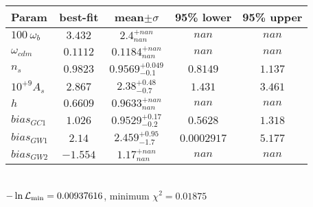 \begin{tabular}{|l|c|c|c|c|} 
 \hline 
Param & best-fit & mean$\pm\sigma$ & 95\% lower & 95\% upper \\ \hline 
$100~\omega_{b }$ &$3.432$ & $2.4_{nan}^{+nan}$ & $nan$ & $nan$ \\ 
$\omega_{cdm }$ &$0.1112$ & $0.1184_{nan}^{+nan}$ & $nan$ & $nan$ \\ 
$n_{s }$ &$0.9823$ & $0.9569_{-0.1}^{+0.049}$ & $0.8149$ & $1.137$ \\ 
$10^{+9}A_{s }$ &$2.867$ & $2.38_{-0.7}^{+0.48}$ & $1.431$ & $3.461$ \\ 
$h$ &$0.6609$ & $0.9633_{nan}^{+nan}$ & $nan$ & $nan$ \\ 
$bias_{GC 1 }$ &$1.026$ & $0.9529_{-0.2}^{+0.17}$ & $0.5628$ & $1.318$ \\ 
$bias_{GW 1 }$ &$2.14$ & $2.459_{-1.7}^{+0.95}$ & $0.0002917$ & $5.177$ \\ 
$bias_{GW 2 }$ &$-1.554$ & $1.17_{nan}^{+nan}$ & $nan$ & $nan$ \\ 
\hline 
 \end{tabular} \\ 
$-\ln{\cal L}_\mathrm{min} =0.00937616$, minimum $\chi^2=0.01875$ \\ 
